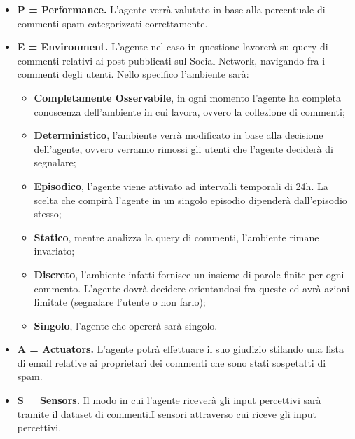 \documentclass{report}
\begin{document}
    \begin{itemize}
        \item 
        {\bfseries P = Performance.} 
        L'agente verrà valutato in base alla percentuale di commenti spam categorizzati correttamente.
        \item 
        {\bfseries E = Environment.} L'agente nel caso in questione lavorerà su query di commenti relativi ai post pubblicati sul Social Network, 
        navigando fra i commenti degli utenti.\newline
        Nello specifico l'ambiente sarà:
            \begin{itemize}
                \item {\bfseries Completamente Osservabile}, in ogni momento l'agente ha completa conoscenza
                dell'ambiente in cui lavora, ovvero la collezione di commenti;
                \item {\bfseries Deterministico}, l'ambiente verrà modificato in base alla decisione dell'agente, 
                ovvero verranno rimossi gli utenti che l'agente deciderà di segnalare;
                \item {\bfseries Episodico}, l'agente viene attivato ad intervalli temporali di 24h. La scelta che compirà l'agente in un singolo episodio dipenderà dall'episodio stesso;
                \item {\bfseries Statico}, mentre analizza la query di commenti, l'ambiente rimane invariato;
                \item {\bfseries Discreto}, l'ambiente infatti fornisce un insieme di parole finite per ogni commento. L'agente
                dovrà decidere orientandosi fra queste ed avrà azioni limitate (segnalare l'utente o non farlo); 
                \item {\bfseries Singolo}, l'agente che opererà sarà singolo.
            \end{itemize}
          
        \item 
        {\bfseries A = Actuators.} L'agente potrà effettuare il suo giudizio stilando una lista di email relative ai proprietari dei commenti che sono stati sospetatti di spam.
        \item 
        {\bfseries S = Sensors.} Il modo in cui l'agente riceverà gli input percettivi sarà tramite il dataset di commenti.I sensori attraverso cui riceve gli input percettivi.
        
    \end{itemize}
    
\end{document}
